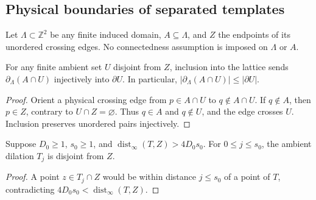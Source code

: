 \subsection{Physical boundaries of separated templates}
\label{sec:area_law_template_cut_boundary}

Let $\Lambda\subset\mathbb Z^2$ be any finite induced domain, $A\subseteq\Lambda$,
and $Z$ the endpoints of its unordered crossing edges. No connectedness
assumption is imposed on $\Lambda$ or $A$.

\begin{lemma}
    \label{thm:area_law_physical_ambient_boundary}
    \leanok
    For any finite ambient set $U$ disjoint from $Z$, inclusion into the
    lattice sends $\partial_\Lambda(A\cap U)$ injectively into $\partial U$.
    In particular, $|\partial_\Lambda(A\cap U)|\le|\partial U|$.
\end{lemma}
\begin{proof}
    \leanok
    Orient a physical crossing edge from $p\in A\cap U$ to
    $q\notin A\cap U$. If $q\notin A$, then $p\in Z$, contrary to
    $U\cap Z=\varnothing$. Thus $q\in A$ and $q\notin U$, and the edge
    crosses $U$. Inclusion preserves unordered pairs injectively.
\end{proof}

\begin{lemma}
    \label{thm:area_law_template_dilation_separation}
    \leanok
    Suppose $D_0\ge1$, $s_0\ge1$, and
    $\operatorname{dist}_\infty(T,Z)>4D_0s_0$.
    For $0\le j\le s_0$, the ambient dilation $T_j$ is disjoint from $Z$.
\end{lemma}
\begin{proof}
    \leanok
    A point $z\in T_j\cap Z$ would be within distance $j\le s_0$ of a
    point of $T$, contradicting $4D_0s_0<\operatorname{dist}_\infty(T,Z)$.
\end{proof}

